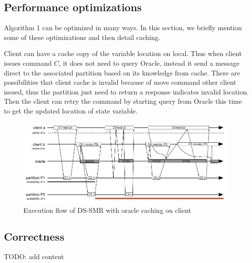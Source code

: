 

\subsection{Performance optimizations}
\label{sec:optm}

Algorithm 1 can be optimized in many ways. In this section, we briefly mention some of these optimizations and then detail caching.

Client can have a cache copy of the variable location on local. Thus when client issues command $C$, it does not need to query Oracle, instead it send a message direct to the associated partition based on its knowledge from cache. There are possibilities that client cache is invalid because of move command other client issued, thus the partition just need to return a response indicates invalid location. Then the client can retry the command by starting query from Oracle this time to get the updated location of state variable. 

\begin{figure}
\begin{minipage}[b]{1\linewidth} %
\centering
      \includegraphics[width=0.85\linewidth]{figures/cache}
\end{minipage}
\caption{Execution flow of DS-SMR with oracle caching on client}
\label{fig:cache}
\end{figure}

\subsection{Correctness}
\label{sec:correctness}
TODO: add content